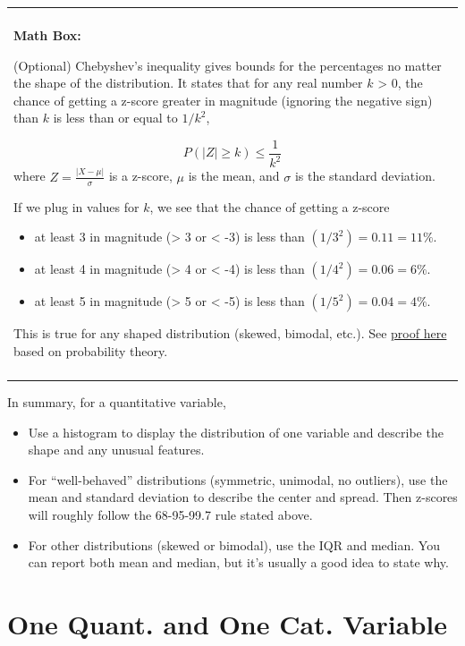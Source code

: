 \documentclass[]{book}
\providecommand{\tightlist}{%
  \setlength{\itemsep}{0pt}\setlength{\parskip}{0pt}}
\newenvironment{mathbox}
{
    \begin{center}
    
    \begin{tabular}{|p{0.8\textwidth}|}
    \rowcolor{LightYellow}
    \hline\\
    \rowcolor{LightYellow}
    \textbf{Math Box:}
}
{
    \\\rowcolor{LightYellow}
    \\\hline
    \end{tabular} 
    \end{center}
}
\begin{document}
\begin{mathbox}
(Optional) Chebyshev's inequality gives bounds for the percentages no
matter the shape of the distribution. It states that for any real number
\(k\) \textgreater{} 0, the chance of getting a z-score greater in
magnitude (ignoring the negative sign) than \(k\) is less than or equal
to \(1/k^2\),

\[P\left(|Z| \geq k\right) \leq \frac{1}{k^2}\] where
\(Z = \frac{|X - \mu|}{\sigma}\) is a z-score, \(\mu\) is the mean, and
\(\sigma\) is the standard deviation.

If we plug in values for \(k\), we see that the chance of getting a
z-score

\begin{itemize}
\tightlist
\item
  at least 3 in magnitude (\textgreater{} 3 or \textless{} -3) is less
  than \((1/3^2) = 0.11 = 11\%\).
\item
  at least 4 in magnitude (\textgreater{} 4 or \textless{} -4) is less
  than \((1/4^2) = 0.06 = 6\%\).
\item
  at least 5 in magnitude (\textgreater{} 5 or \textless{} -5) is less
  than \((1/5^2) = 0.04 = 4\%\).
\end{itemize}

This is true for any shaped distribution (skewed, bimodal, etc.). See
\href{https://en.wikipedia.org/wiki/Markov\%27s_inequality}{proof here}
based on probability theory.
\end{mathbox}

In summary, for a quantitative variable,

\begin{itemize}
\tightlist
\item
  Use a histogram to display the distribution of one variable and describe the shape and any unusual features.
\item
  For ``well-behaved'' distributions (symmetric, unimodal, no outliers), use the mean and standard deviation to describe the center and spread. Then z-scores will roughly follow the 68-95-99.7 rule stated above.
\item
  For other distributions (skewed or bimodal), use the IQR and median. You can report both mean and median, but it's usually a good idea to state why.
\end{itemize}

\hypertarget{one-quant.-and-one-cat.-variable}{%
\section{One Quant. and One Cat. Variable}\label{one-quant.-and-one-cat.-variable}}
\end{document}

